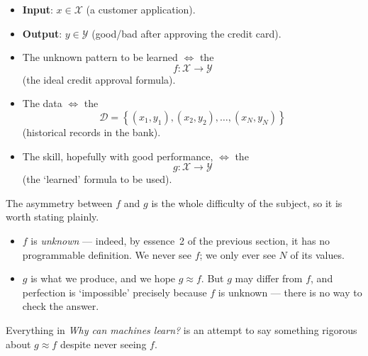 \begin{notation}
    \hfill
    \begin{itemize}
        \item \textbf{Input}: \(x \in \mathcal{X}\) (a customer application).
        \item \textbf{Output}: \(y \in \mathcal{Y}\) (good/bad after approving
            the credit card).
        \item The unknown pattern to be learned \(\iff\) the
            \[
                f\colon \mathcal{X} \to \mathcal{Y}
            \]
            (the ideal credit approval formula).
        \item The data \(\iff\) the 
            \[
                \mathcal{D} = \left\{ (x_1, y_1), (x_2, y_2), \dots ,
                (x_N, y_N) \right\}
            \]
            (historical records in the bank).
        \item The skill, hopefully with good performance, \(\iff\) the
            \[
                g\colon \mathcal{X} \to \mathcal{Y}
            \]
            (the `learned' formula to be used).
    \end{itemize}
\end{notation}

\begin{center}
\end{center}

\begin{remark}
    The asymmetry between \(f\) and \(g\) is the whole difficulty of the
    subject, so it is worth stating plainly.
    \begin{itemize}
        \item \(f\) is \emph{unknown} --- indeed, by essence~2 of the previous
            section, it has no programmable definition. We never see \(f\); we
            only ever see \(N\) of its values.
        \item \(g\) is what we produce, and we hope \(g \approx f\). But \(g\)
            may differ from \(f\), and perfection is `impossible' precisely
            because \(f\) is unknown --- there is no way to check the answer.
    \end{itemize}
    Everything in \emph{Why can machines learn?} is an attempt to say something
    rigorous about \(g \approx f\) despite never seeing \(f\).
\end{remark}


